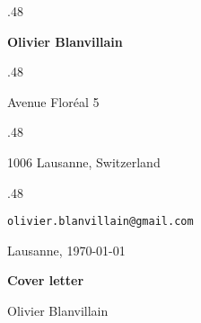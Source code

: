 \documentclass[marginmode, 11pt]{res}
\newcommand{\centered}[1]{\moveleft.48\hoffset\centerline{#1}}
\begin{document}
\centered{\LARGE\textbf{Olivier Blanvillain}}
\vspace{10pt}

\centered{Avenue Floréal 5}
\centered{1006 Lausanne, Switzerland}
\vspace{3pt}
\vspace{2pt}
\centered{\texttt{olivier.blanvillain@gmail.com}}

\begin{resume}
\begin{adjustwidth}{10pt}{100pt}
\setlength\parskip{10pt}

\vspace{50pt}

Lausanne, \today

\textbf{Cover letter}

Olivier Blanvillain

\end{adjustwidth}
\end{resume}
\end{document}
